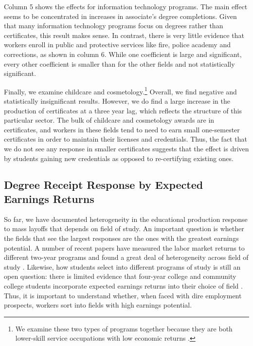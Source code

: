 Column 5 shows the effects for information technology programs. The main effect seems to be concentrated in increases in associate's degree completions. Given that many information technology programs focus on  degrees rather than certificates, this result makes sense. In contrast, there is very little evidence that workers enroll in public and protective services like fire, police academy and corrections, as shown in column 6.  While one coefficient is large and significant, every other coefficient is smaller than for the other fields and not statistically significant. 

Finally, we examine childcare and cosmetology.\footnote{We examine these two types of programs together because they are both lower-skill service occupations with low economic returns \citep{SKG2014}.} Overall, we find negative and statistically insignificant results. However, we do find a large increase in the production of certificates at a three year lag, which reflects  the structure of this particular sector. The bulk of childcare and cosmetology awards are in certificates, and workers in these fields tend to need to earn small one-semester certificates in order to maintain their licenses and credentials. Thus, the fact that we do not see any response in smaller certificates suggests that the effect is driven by students gaining new credentials as opposed to re-certifying existing ones. 

\subsection{Degree Receipt Response by Expected Earnings Returns}
So far, we have documented heterogeneity in the educational production response to mass layoffs that depends on field of study. An important question is whether the fields that see the largest responses are the ones with the greatest earnings potential. A number of recent papers have measured the labor market returns to different two-year programs and found a great deal of heterogeneity across field of study \citep{SKG2014, JTC2014, BLT2014}. Likewise, how students select into different programs of study is still an open question: there is limited evidence that four-year college and community college students incorporate expected earnings returns into their choice of field  \citep{bakereffect, arcidiacono2012modeling, wiswall2015determinants}. Thus, it is important to understand whether, when faced with dire employment prospects, workers sort into fields with high earnings potential. 

